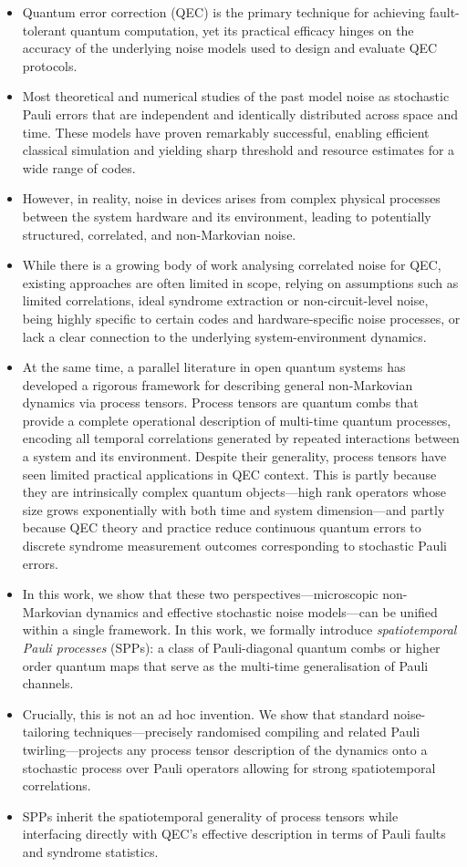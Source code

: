 \begin{itemize}
    \item Quantum error correction (QEC) is the primary technique for achieving fault-tolerant quantum computation, yet its practical efficacy hinges on the accuracy of the underlying noise models used to design and evaluate QEC protocols.
    \item Most theoretical and numerical studies of the past model noise as stochastic Pauli errors that are independent and identically distributed across space and time. These models have proven remarkably successful, enabling efficient classical simulation and yielding sharp threshold and resource estimates for a wide range of codes.
    \item However, in reality, noise in devices arises from complex physical processes between the system hardware and its environment, leading to potentially structured, correlated, and non-Markovian noise.
    \item While there is a growing body of work analysing correlated noise for QEC, existing approaches are often limited in scope, relying on assumptions such as limited correlations, ideal syndrome extraction or non-circuit-level noise, being highly specific to certain codes and hardware-specific noise processes, or lack a clear connection to the underlying system-environment dynamics.
    \item At the same time, a parallel literature in open quantum systems has developed a rigorous framework for describing general non-Markovian dynamics via process tensors. Process tensors are quantum combs that provide a complete operational description of multi-time quantum processes, encoding all temporal correlations generated by repeated interactions between a system and its environment. Despite their generality, process tensors have seen limited practical applications in QEC context. This is partly because they are intrinsically complex quantum objects---high rank operators whose size grows exponentially with both time and system dimension---and partly because QEC theory and practice reduce continuous quantum errors to discrete syndrome measurement outcomes corresponding to stochastic Pauli errors.
    \item In this work, we show that these two perspectives---microscopic non-Markovian dynamics and effective stochastic noise models---can be unified within a single framework. In this work, we formally introduce \emph{spatiotemporal Pauli processes} (SPPs): a class of Pauli-diagonal quantum combs or higher order quantum maps that serve as the multi-time generalisation of Pauli channels.
    \item Crucially, this is not an ad hoc invention. We show that standard noise-tailoring techniques---precisely randomised compiling and related Pauli twirling---projects any process tensor description of the dynamics onto a stochastic process over Pauli operators allowing for strong spatiotemporal correlations.
    \item SPPs inherit the spatiotemporal generality of process tensors while interfacing directly with QEC's effective description in terms of Pauli faults and syndrome statistics.
\end{itemize}